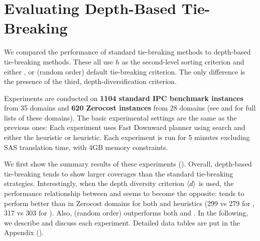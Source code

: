 \section{Evaluating Depth-Based Tie-Breaking}
\label{sec:depth-based-evaluation}



We compared the performance of standard tie-breaking methods to depth-based tie-breaking methods. These all use $h$
as the second-level sorting criterion and either \fifo, \lifo or \ro (random order) default tie-breaking criterion.
The only difference is the presence of the third, depth-diversification criterion.

Experiments are conducted on \textbf{1104 standard IPC benchmark
instances} from 35 domains  and \textbf{620 Zerocost instances} from 28 domains (see  and  for full lists of these domains). 
The basic experimental settings are the same as the previous ones:
Each experiment uses Fast Downward planner using \astar search and either the \lmcut heuristic or \mands heuristic.
Each experiment is run for 5 minutes excluding SAS translation time, with 4GB memory constraints.

We first show the summary results of these experiments ().
Overall, depth-based tie-breaking tends to show larger coverages than the
standard tie-breaking strategies.
Interestingly, when the depth diversity criterion ${\left<d\right>}$ is used, 
the performance relationship between \lifo and \fifo seems to become the opposite:
\fifo tends to perform better than \lifo in Zerocost domains for both
\lmcut and \mands heuristics (299 vs 279 for \lmcut, 317 vs 303 for \mands).
Also, \ro (random order) outperforms both \fifo and \lifo.
In the following, we describe and discuss each experiment.
Detailed data tables are put in the Appendix ().

